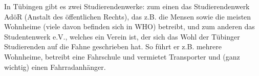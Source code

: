 
In Tübingen gibt es zwei Studierendenwerke: zum einen das Studierendenwerk AdöR (Anstalt des
  öffentlichen Rechts), das z.B. die Mensen sowie die meisten
  Wohnheime (viele davon befinden sich in WHO) betreibt, und zum
  anderen das Studentenwerk e.V., %
  welches ein Verein ist, der sich das Wohl
  der Tübinger Studierenden auf die Fahne geschrieben
  hat.  So führt er z.B. mehrere Wohnheime, betreibt eine Fahrschule
  und vermietet Transporter und (ganz wichtig) einen Fahrradanhänger.
